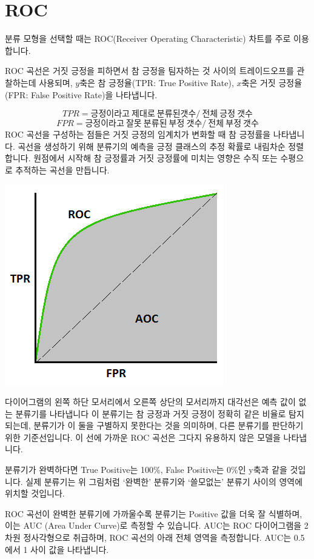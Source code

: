 \documentclass[12pt,]{book}
\begin{document}
\hypertarget{roc}{%
\section{ROC}\label{roc}}

분류 모형을 선택할 때는 ROC(Receiver Operating Characteristic) 차트를 주로 이용합니다.

ROC 곡선은 거짓 긍정을 피하면서 참 긍정을 팀자하는 것 사이의 트레이드오프를 관찰하는데 사용되며, \(y\)축은 참 긍정율(TPR: True Positive Rate), \(x\)축은 거짓 긍정율(FPR: False Positive Rate)을 나타냅니다.

\[TPR = 긍정이라고\ 제대로\ 분류된 갯수 /\ 전체\ 긍정\ 갯수\]
\[FPR = 긍정이라고\ 잘못\ 분류된\ 부정\ 갯수 /\ 전체\ 부정\ 갯수\]
ROC 곡선을 구성하는 점들은 거짓 긍정의 임계치가 변화할 때 참 긍정률을 나타냅니다. 곡선을 생성하기 위해 분류기의 예측을 긍정 클래스의 추정 확률로 내림차순 정렬합니다. 원점에서 시작해 참 긍정률과 거짓 긍정률에 미치는 영향은 수직 또는 수평으로 추적하는 곡선을 만듭니다.

\begin{center}\includegraphics[width=0.5\linewidth]{images/roc} \end{center}

다이어그램의 왼쪽 하단 모서리에서 오른쪽 상단의 모서리까지 대각선은 예측 값이 없는 분류기를 나타냅니다 이 분류기는 참 긍정과 거짓 긍정이 정확히 같은 비율로 탐지되는데, 분류기가 이 둘을 구별하지 못한다는 것을 의미하며, 다른 분류기를 판단하기 위한 기준선입니다. 이 선에 가까운 ROC 곡선은 그다지 유용하지 않은 모델을 나타냅니다.

분류기가 완벽하다면 True Positive는 100\%, False Positive는 0\%인 y축과 같을 것입니다. 실제 분류기는 위 그림처럼 `완벽한' 분류기와 `쓸모없는' 분류기 사이의 영역에 위치할 것입니다.

ROC 곡선이 완벽한 분류기에 가까울수록 분류기는 Positive 값을 더욱 잘 식별하며, 이는 AUC (Area Under Curve)로 측정할 수 있습니다. AUC는 ROC 다이어그램을 2차원 정사각형으로 취급하며, ROC 곡선의 아래 전체 영역을 측정합니다. AUC는 0.5에서 1 사이 값을 나타냅니다.
\end{document}
